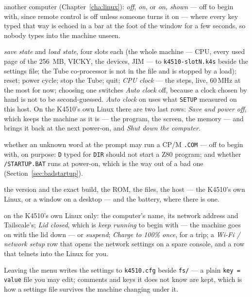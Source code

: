 \begin{description}
  another computer (Chapter~\ref{cha:linux}): \emph{off}, \emph{on}, or
  \emph{on, shown} --- off to begin with, since remote control is off
  unless someone turns it on --- where every key typed
  that way is echoed in a bar at the foot of the window for a few
  seconds, so nobody types into the machine unseen.
\item[Machine] \emph{save state} and \emph{load state}, four slots each
  (the whole machine --- CPU, every used page of the 256~MB, VICKY, the
  devices, JIM --- to \texttt{k4510-slotN.k4s} beside the settings file;
  the Tube co-processor is not in the file and is stopped by a load);
  reset; power cycle; stop the Tube; quit; \emph{CPU clock} --- the
  steps, live, 60\,MHz at the most for now; choosing one switches \emph{Auto clock} off, because a
  clock chosen by hand is not to be second-guessed. \emph{Auto clock} on
  uses what \verb|SETUP| measured on this host. On the K4510's own Linux
  there are two last rows: \emph{Save and power off}, which keeps the
  machine as it is --- the program, the screen, the memory --- and brings
  it back at the next power-on, and \emph{Shut down the computer}.
\item[Shell] whether an unknown word at the prompt may run a CP/M
  \texttt{.COM} --- off to begin with, on
  purpose: \verb|D| typed for \verb|DIR| should not start a Z80 program;
  and whether \texttt{/STARTUP.BAT} runs at power-on, which is the way
  out of a bad one (Section~\ref{sec:badstartup}).
\item[Info] the version and the exact build, the ROM, the files, the
  host --- the K4510's own Linux, or a window on a desktop --- and the
  battery, where there is one.
\item[Host] on the K4510's own Linux only: the computer's name, its
  network address and Tailscale's; \emph{Lid closed}, which is
  \emph{keep running} to begin with --- the machine goes on with the lid
  down --- or \emph{suspend}; \emph{Charge to 100\% once}, for a
  trip; a \emph{Wi-Fi / network setup} row that
  opens the network settings on a spare console, and a row that telnets
  into the Linux for you.
\end{description}

Leaving the menu writes the settings to \texttt{k4510.cfg} beside
\texttt{fs/} --- a plain \texttt{key = value} file you may edit;
comments and keys it does not know are kept, which is how a settings
file survives the machine changing under it.

